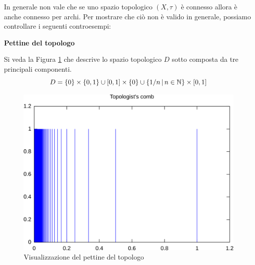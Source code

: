 \begin{remark}
	In generale non vale che se uno spazio topologico $(X,\tau)$ è connesso allora è anche connesso per archi. Per mostrare che ciò non è valido in generale, possiamo controllare i seguenti controesempi: \\

		\begin{flushleft}
			\textbf{Pettine del topologo}
		\end{flushleft}

		Si veda la Figura \ref{fig:comb_topology} che descrive lo spazio topologico $D$ sotto composta da tre principali componenti.
		\begin{equation*}
		D = \left\{0\right\} \times \left\{0,1\right\} \cup \left[0,1\right]\times \left\{0\right\} \cup \left\{1/n \,\middle|\, n \in \mathbb{N} \right\} \times \left[0,1\right]
		\end{equation*}
		\begin{figure}[h]
			\centering
			\includegraphics[width=0.5\linewidth]{images/topologia_generale/g160}
			\caption{Visualizzazione del pettine del topologo}
			\label{fig:comb_topology}
		\end{figure}
		

\end{remark}
